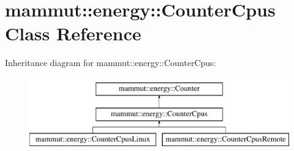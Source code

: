 \hypertarget{classmammut_1_1energy_1_1CounterCpus}{\section{mammut\-:\-:energy\-:\-:Counter\-Cpus Class Reference}
\label{classmammut_1_1energy_1_1CounterCpus}
}
Inheritance diagram for mammut\-:\-:energy\-:\-:Counter\-Cpus\-:\begin{figure}[H]
\begin{center}
\leavevmode
\includegraphics[height=3.000000cm]{classmammut_1_1energy_1_1CounterCpus}
\end{center}
\end{figure}
